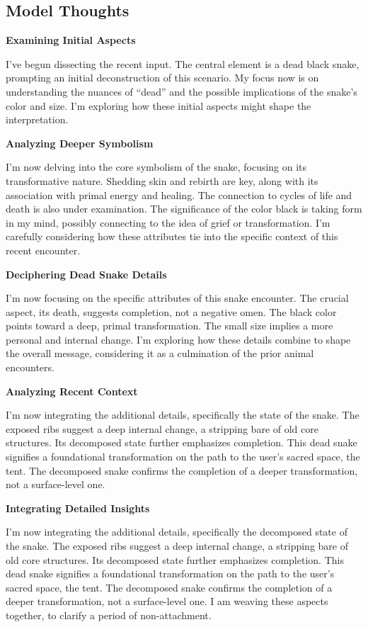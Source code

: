 \documentclass{article}
\begin{document}
\subsection*{Model Thoughts}\label{model-thoughts}

\textbf{Examining Initial Aspects}

I've begun dissecting the recent input. The central element is a dead
black snake, prompting an initial deconstruction of this scenario. My
focus now is on understanding the nuances of ``dead'' and the possible
implications of the snake's color and size. I'm exploring how these
initial aspects might shape the interpretation.

\textbf{Analyzing Deeper Symbolism}

I'm now delving into the core symbolism of the snake, focusing on its
transformative nature. Shedding skin and rebirth are key, along with its
association with primal energy and healing. The connection to cycles of
life and death is also under examination. The significance of the color
black is taking form in my mind, possibly connecting to the idea of
grief or transformation. I'm carefully considering how these attributes
tie into the specific context of this recent encounter.

\textbf{Deciphering Dead Snake Details}

I'm now focusing on the specific attributes of this snake encounter. The
crucial aspect, its death, suggests completion, not a negative omen. The
black color points toward a deep, primal transformation. The small size
implies a more personal and internal change. I'm exploring how these
details combine to shape the overall message, considering it as a
culmination of the prior animal encounters.

\textbf{Analyzing Recent Context}

I'm now integrating the additional details, specifically the state of
the snake. The exposed ribs suggest a deep internal change, a stripping
bare of old core structures. Its decomposed state further emphasizes
completion. This dead snake signifies a foundational transformation on
the path to the user's sacred space, the tent. The decomposed snake
confirms the completion of a deeper transformation, not a surface-level
one.

\textbf{Integrating Detailed Insights}

I'm now integrating the additional details, specifically the decomposed
state of the snake. The exposed ribs suggest a deep internal change, a
stripping bare of old core structures. Its decomposed state further
emphasizes completion. This dead snake signifies a foundational
transformation on the path to the user's sacred space, the tent. The
decomposed snake confirms the completion of a deeper transformation, not
a surface-level one. I am weaving these aspects together, to clarify a
period of non-attachment.
\end{document}
